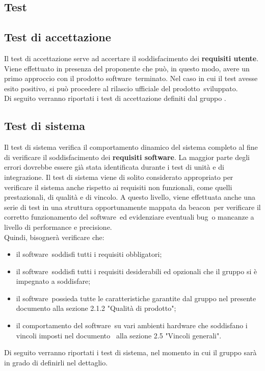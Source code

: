 \documentclass[../PianoDiQualifica.tex]{subfiles}
\begin{document}
\begin{appendices}

\section{Test}
	\subsection{Test di accettazione}
	Il test di accettazione serve ad accertare il soddisfacimento dei \textbf{requisiti utente}. Viene effettuato in presenza del proponente che può, in questo modo, avere un primo approccio con il prodotto software\g\ terminato. Nel caso in cui il test avesse esito positivo, si può procedere al rilascio ufficiale del prodotto\g\ 
sviluppato.\\
	Di seguito verranno riportati i test di accettazione definiti dal gruppo \leaf.
	\subsection{Test di sistema}
	Il test di sistema verifica il comportamento dinamico del sistema completo al fine di verificare il soddisfacimento dei \textbf{requisiti software}. La maggior parte degli errori dovrebbe essere già stata identificata durante i test di unità e di integrazione. Il test di sistema viene di solito considerato appropriato per verificare il sistema anche rispetto ai requisiti non funzionali, come quelli prestazionali, di qualità e di vincolo. A questo livello, viene effettuata anche una serie di test in una struttura opportunamente mappata da beacon\g\ per verificare il corretto funzionamento del software\g\ ed evidenziare eventuali bug\g\ o mancanze a livello di performance e precisione.\\
	Quindi, bisognerà verificare che:
	\begin{itemize}
		\item il software\g\ soddisfi tutti i requisiti obbligatori;
		\item il software\g\ soddisfi tutti i requisiti desiderabili ed opzionali che il gruppo si è impegnato a soddisfare;
		\item il software\g\ possieda tutte le caratteristiche garantite dal gruppo nel presente documento alla sezione 2.1.2 "Qualità di prodotto";
		\item il comportamento del software\g\ su vari ambienti hardware che soddisfano i vincoli imposti nel documento \analisideirequisiti\ alla sezione 2.5 "Vincoli generali".
	\end{itemize}
	Di seguito verranno riportati i test di sistema, nel momento in cui il gruppo sarà in grado di definirli nel dettaglio.
\end{appendices}
\end{document}

